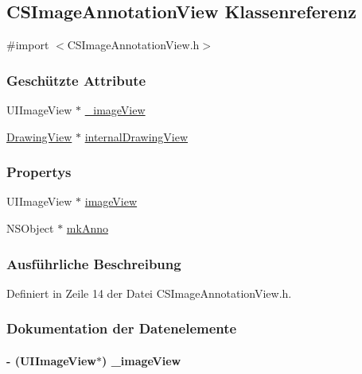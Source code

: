 \hypertarget{interface_c_s_image_annotation_view}{
\subsection{CSImageAnnotationView Klassenreferenz}
\label{interface_c_s_image_annotation_view}
}


{\ttfamily \#import $<$CSImageAnnotationView.h$>$}\subsubsection*{Geschützte Attribute}
\begin{DoxyCompactItemize}
\item 
UIImageView $\ast$ \hyperlink{interface_c_s_image_annotation_view_a9bb37a0b4a912db69d8156f9168b0700}{\_\-imageView}
\item 
\hyperlink{interface_drawing_view}{DrawingView} $\ast$ \hyperlink{interface_c_s_image_annotation_view_ad20380a97d7e751f70ceffbbe757e748}{internalDrawingView}
\end{DoxyCompactItemize}
\subsubsection*{Propertys}
\begin{DoxyCompactItemize}
\item 
UIImageView $\ast$ \hyperlink{interface_c_s_image_annotation_view_a1a6064acb727d00905158ab1938a9b8b}{imageView}
\item 
NSObject $\ast$ \hyperlink{interface_c_s_image_annotation_view_a1e946230b4fb6f249eb43cc61e5e7978}{mkAnno}
\end{DoxyCompactItemize}


\subsubsection{Ausführliche Beschreibung}


Definiert in Zeile 14 der Datei CSImageAnnotationView.h.

\subsubsection{Dokumentation der Datenelemente}
\hypertarget{interface_c_s_image_annotation_view_a9bb37a0b4a912db69d8156f9168b0700}{
\paragraph[{\_\-imageView}]{\setlength{\rightskip}{0pt plus 5cm}-\/ (UIImageView$\ast$) {\bf \_\-imageView}}\hfill}
\label{interface_c_s_image_annotation_view_a9bb37a0b4a912db69d8156f9168b0700}



